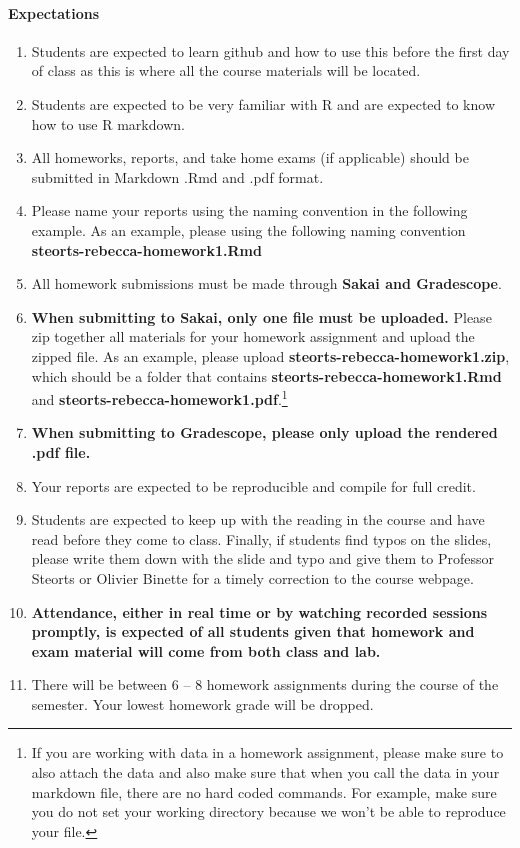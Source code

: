 \documentclass[11pt]{article}
\begin{document}


\paragraph{Expectations}
\begin{enumerate}
\item Students are expected to learn github and how to use this before the first day of class as this is where all the course materials will be located. 
\item Students are expected to be very familiar with R and are expected to know how to use R markdown. 
\item All homeworks, reports, and take home exams (if applicable) should be submitted in Markdown .Rmd and .pdf format. 
\item Please name your reports using the naming convention in the following example. As an example, please using the following naming convention \textbf{steorts-rebecca-homework1.Rmd} 
\item All homework submissions must be made through \textbf{Sakai and Gradescope}.
\item  \textbf{When submitting to Sakai, only one file must be uploaded.} Please zip together all materials for your homework assignment and upload the zipped file. As an example, please upload \textbf{steorts-rebecca-homework1.zip}, which should be a folder that contains \textbf{steorts-rebecca-homework1.Rmd}  and \textbf{steorts-rebecca-homework1.pdf}.\footnote{If you are working with data in a homework assignment, please make sure to also attach the data and also make sure that when you call the data in your markdown file, there are no hard coded commands. For example, make sure you do not set your working directory because we won't be able to reproduce your file.}
\item \textbf{When submitting to Gradescope, please only upload the rendered .pdf file.}
\item Your reports are expected to be reproducible and compile for full credit. 
\item Students are expected to keep up with the reading in the course and have read before they come to class. Finally, if students find typos on the slides, please write them down with the slide and typo and give them to Professor Steorts or Olivier Binette for a timely correction to the course webpage.  
\item \textbf{Attendance, either in real time or by watching recorded sessions promptly, is expected of all students given that homework and exam material will come from both class and lab.}
\item There will be between 6 -- 8 homework assignments during the course of the semester.  Your lowest homework grade will be dropped. 
\end{enumerate}
\end{document}
